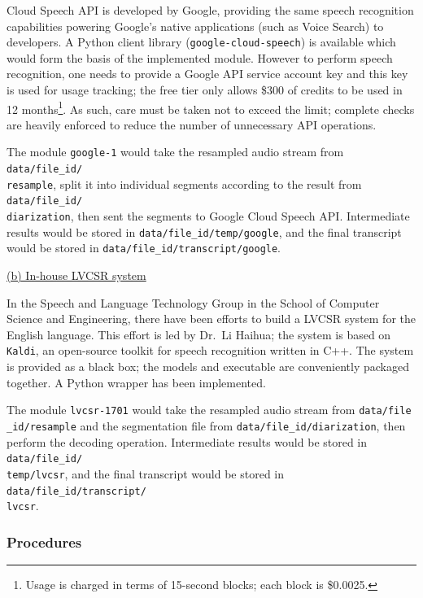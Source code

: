 Cloud Speech API is developed by Google, providing the same speech recognition capabilities powering Google's native applications (such as Voice Search) to developers. A Python client library (\texttt{google-cloud-speech}) is available which would form the basis of the implemented module. However to perform speech recognition, one needs to provide a Google API service account key and this key is used for usage tracking; the free tier only allows \$300 of credits to be used in 12 months\footnote{Usage is charged in terms of 15-second blocks; each block is \$0.0025.}. As such, care must be taken not to exceed the limit; complete checks are heavily enforced to reduce the number of unnecessary API operations.

The module \texttt{google-1} would take the resampled audio stream from \texttt{data/file\_id/\\ resample}, split it into individual segments according to the result from \texttt{data/file\_id/\\diarization}, then sent the segments to Google Cloud Speech API\@. Intermediate results would be stored in \texttt{data/file\_id/temp/google}, and the final transcript would be stored in \texttt{data/file\_id/transcript/google}.

\underline{(b) In-house LVCSR system}

In the Speech and Language Technology Group in the School of Computer Science and Engineering, there have been efforts to build a LVCSR system for the English language. This effort is led by Dr.\ Li Haihua; the system is based on \texttt{Kaldi}, an open-source toolkit for speech recognition written in C++. The system is provided as a black box; the models and executable are conveniently packaged together. A Python wrapper has been implemented.

The module \texttt{lvcsr-1701} would take the resampled audio stream from \texttt{data/file\\ \_id/resample} and the segmentation file from \texttt{data/file\_id/diarization}, then perform the decoding operation. Intermediate results would be stored in \texttt{data/file\_id/\\ temp/lvcsr}, and the final transcript would be stored in \texttt{data/file\_id/transcript/\\lvcsr}.

\subsubsection{Procedures}

